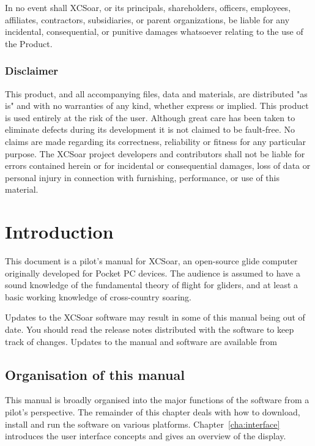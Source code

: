 \documentclass[a4paper,12pt]{refrep}
\begin{document}
In no event shall XCSoar, or its principals, shareholders, officers,
employees, affiliates, contractors, subsidiaries, or parent
organizations, be liable for any incidental, consequential, or
punitive damages whatsoever relating to the use of the Product.

\subsection*{Disclaimer}

This product, and all accompanying files, data and materials, are
distributed "as is" and with no warranties of any kind, whether
express or implied.  This product is used entirely at the risk of the
user.  Although great care has been taken to eliminate defects during
its development it is not claimed to be fault-free. No claims are made
regarding its correctness, reliability or fitness for any particular
purpose.  The XCSoar project developers and contributors shall not be
liable for errors contained herein or for incidental or consequential
damages, loss of data or personal injury in connection with
furnishing, performance, or use of this material.


\chapter{Introduction}\label{cha:introduction}
This document is a pilot's manual for XCSoar, an open-source glide
computer originally developed for Pocket PC devices.  The audience 
is assumed to have a sound knowledge of the fundamental theory of flight for
gliders, and at least a basic working knowledge of cross-country soaring.

Updates to the XCSoar software may result in some of this manual being
out of date. You should read the release notes distributed with the
software to keep track of changes.  Updates to the manual and software
are available from 
\begin{quote}
\xcsoarwebsite
\end{quote}

\section{Organisation of this manual}

This manual is broadly
organised into the major functions of the software from a pilot's perspective.  The remainder of this chapter
deals with how to download, install and run the software on various
platforms.  Chapter~\ref{cha:interface} introduces the user interface
concepts and gives an overview of the display.
\end{document}
